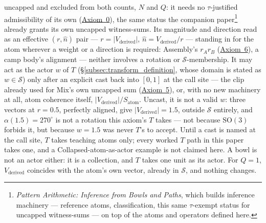 \documentclass[12pt, a4paper]{article}
\begin{document}
uncapped and excluded from both counts, $N$ and $Q$: it needs no $\tau$-justified
admissibility of its own (\hyperref[subsec:axiom0_admissibility]{Axiom~0}),
the same status the companion paper\footnote{\emph{Pattern
Arithmetic: Inference from Bowls and Paths}, which builds inference
machinery --- reference atoms, classification, this same
$\tau$-exempt status for uncapped witness-sums --- on top of the
atoms and operators defined here.} already grants its own uncapped
witness-sums. Its magnitude and direction read as an effective
$(r,\hat n)$ pair --- $r=\lvert V_{\text{derived}}\rvert$, $\hat n =
V_{\text{derived}}/r$ --- standing in for the atom wherever a weight
or a direction is required: Assembly's $r_Ar_B$
(\hyperref[subsec:axiom_assembly]{Axiom~6}), a camp body's alignment ---
neither involves a rotation or $\mathcal{S}$-membership. It may act
as the actor $w$ of $T$ (\S\ref{subsec:transform_definition}, whose
domain is stated as $w\in\mathcal{S}$) only after an explicit cast
back into $[0,1]$ at the call site --- the clip already used for
Mix's own uncapped sum (\hyperref[subsec:axiom_interference]{Axiom~5}), or,
with no new machinery at all, atom coherence itself, $\lvert
V_{\text{derived}}\rvert/S_{\text{atom}}$. Uncast, it is not a valid
$w$: three vectors at $r=0.5$, perfectly aligned, give $\lvert
V_{\text{derived}}\rvert=1.5$, outside $\mathcal{S}$ entirely, and
$\alpha(1.5)=270^\circ$ is not a rotation this axiom's $T$ takes ---
not because $\mathrm{SO}(3)$ forbids it, but because $w=1.5$ was
never $T$'s to accept. Until a cast is named at the call site, $T$
takes teaching atoms only; every worked $T$ path in this paper takes
one, and a Collapsed-atom-as-actor example is not claimed here. A bowl is not an actor either: it is a collection, and $T$ takes one unit as its actor. For $Q=1$,
$V_{\text{derived}}$ coincides with the atom's own vector, already
in $\mathcal{S}$, and nothing changes.
\end{document}
